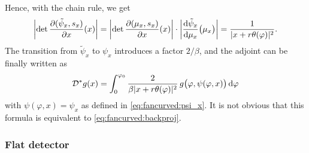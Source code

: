 \documentclass{amsart}
\renewcommand*{\phi}{\varphi}
\begin{document}
%
Hence, with the chain rule, we get
%
\begin{equation*}
 \ABSLR{\DET \frac{\partial(\tilde\psi_x, s_x)}{\partial x} (x)} = \ABSLR{\DET \frac{\partial(\mu_x, s_x)}{\partial x} (x)} \cdot
 \ABSLR{\frac{\D \tilde\psi_x}{\D \mu_x}\big(\mu_x\big)} = \frac{1}{\ABS{x + r\theta(\phi)}^2}.
\end{equation*}
%
The transition from $\tilde\psi_x$ to $\psi_x$ introduces a factor $2/\beta$, and the adjoint can be finally written as
%
\begin{equation}
 \label{eq:fancurved:backproj_alt}
 \OPD^* g(x) = \int_0^{\phi_0} \frac{2}{\beta \ABS{x + r\theta(\phi)}^2}\, g\big(\phi, \psi(\phi, x)\big)\, \D \phi
\end{equation}
%
with $\psi(\phi, x) = \psi_x$ as defined in \eqref{eq:fancurved:psi_x}. It is not obvious that this formula is equivalent to 
\eqref{eq:fancurved:backproj}.
\vspace{5ex}%



\subsubsection{Flat detector}
\label{sec:applications:fanbeam:flat}
\end{document}
